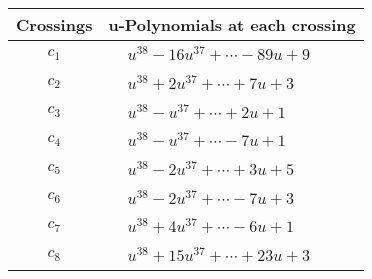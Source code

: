 \documentclass[1p]{elsarticle_modified}
\theoremstyle{definition}
\begin{document}
\begin{tabular}{m{50pt}|m{274pt}}
Crossings & \hspace{64pt}u-Polynomials at each crossing \\
\hline $$\begin{aligned}c_{1}\end{aligned}$$&$\begin{aligned}
&u^{38}-16 u^{37}+\cdots-89 u+9
\end{aligned}$\\
\hline $$\begin{aligned}c_{2}\end{aligned}$$&$\begin{aligned}
&u^{38}+2 u^{37}+\cdots+7 u+3
\end{aligned}$\\
\hline $$\begin{aligned}c_{3}\end{aligned}$$&$\begin{aligned}
&u^{38}- u^{37}+\cdots+2 u+1
\end{aligned}$\\
\hline $$\begin{aligned}c_{4}\end{aligned}$$&$\begin{aligned}
&u^{38}- u^{37}+\cdots-7 u+1
\end{aligned}$\\
\hline $$\begin{aligned}c_{5}\end{aligned}$$&$\begin{aligned}
&u^{38}-2 u^{37}+\cdots+3 u+5
\end{aligned}$\\
\hline $$\begin{aligned}c_{6}\end{aligned}$$&$\begin{aligned}
&u^{38}-2 u^{37}+\cdots-7 u+3
\end{aligned}$\\
\hline $$\begin{aligned}c_{7}\end{aligned}$$&$\begin{aligned}
&u^{38}+4 u^{37}+\cdots-6 u+1
\end{aligned}$\\
\hline $$\begin{aligned}c_{8}\end{aligned}$$&$\begin{aligned}
&u^{38}+15 u^{37}+\cdots+23 u+3
\end{aligned}$\\

\end{tabular}
\end{document}
